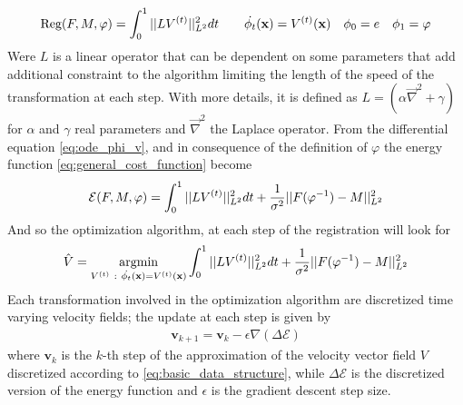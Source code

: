 \begin{align*}
\text{Reg}(F,M,\varphi) =  \int_0^1  \vert\lvert L V^{(t)}  \rvert\vert_{L^{2}}^{2}  dt
\qquad 
\dot{\phi_{t}} (\mathbf{x}) = V^{(t)}(\mathbf{x} ) 
\quad 
\phi_{0} = e
\quad 
\phi_{1} = \varphi
\end{align*}
Were $L$ is a linear operator that can be dependent on some parameters that add additional constraint to the algorithm limiting the length of the speed of the transformation at each step. 
With more details, it is defined as $L = (\alpha\vec \nabla^2 + \gamma)$ for $\alpha$ and $\gamma$ real parameters and $\vec \nabla^2$ the Laplace operator.
From the differential equation \ref{eq:ode_phi_v}, and in consequence of the definition of $\varphi$ the energy function \ref{eq:general_cost_function} become
\begin{align*}
\mathcal{E}(F, M, \varphi) 
= 
\int_0^1 \vert\lvert L V^{(t)}  \rvert\vert_{L^{2}}^{2} dt + \frac{1}{\sigma^2}\vert\lvert F(\varphi^{-1})  - M   \rvert\vert_{L^{2}}^{2}
\end{align*}
And so the optimization algorithm, at each step of the registration will look for
\begin{align*}
\hat{V} 
= 
\argmin_{V^{(t)} ~ : ~ \dot{\phi_{t}} (\mathbf{x}) = V^{(t)}(\mathbf{x} ) } 
\int_0^1 \euclideanMetric{L V^{(t)} }_{L^{2}}^{2} dt + \frac{1}{\sigma^2}\euclideanMetric{F(\varphi^{-1})  - M  }_{L^{2}}^{2}
\end{align*}
Each transformation involved in the optimization algorithm are discretized time varying velocity fields; the update at each step is given by
\begin{align*}
\mathbf{v}_{k+1} = \mathbf{v}_{k} - \epsilon \nabla (\Delta\mathcal{E})
\end{align*}
where $\mathbf{v}_{k}$ is the $k$-th step of the approximation of the velocity vector field $V$ discretized according to \ref{eq:basic_data_structure}, while $\Delta\mathcal{E}$ is the discretized version of the energy function and $\epsilon$ is the gradient descent step size.\\

